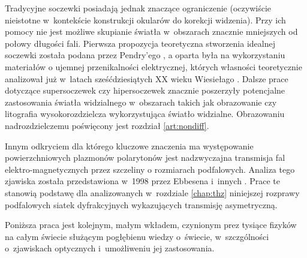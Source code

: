 Tradycyjne soczewki posiadają jednak znaczące ograniczenie (oczywiście nieistotne w~kontekście konstrukcji okularów do korekcji widzenia). Przy ich pomocy nie jest możliwe skupianie światła w~obszarach znacznie mniejszych od połowy długości fali. Pierwsza propozycja teoretyczna stworzenia idealnej soczewki została podana przez Pendry'ego \cite{PhysRevLett.85.3966}, a oparta była na wykorzystaniu materiałów o ujemnej przenikalności elektrycznej, których własności teoretycznie analizował już w~latach sześćdziesiątych XX wieku Wiesiełago \cite{veselago1968electrodynamics}. Dalsze prace dotyczące supersoczewek czy hipersoczewek \cite{liu2007far} znacznie poszerzyły potencjalne zastosowania światła widzialnego w~obszarach takich jak obrazowanie czy litografia wysokorozdzielcza wykorzystująca światło widzialne. Obrazowaniu nadrozdzielczemu poświęcony jest rozdział \ref{art:nondiff}.

Innym odkryciem dla którego kluczowe znaczenia ma występowanie powierzchniowych plazmonów polarytonów jest nadzwyczajna transmisja fal elektro-magnetycznych przez szczeliny o rozmiarach podfalowych. Analiza tego zjawiska została przedstawiona w~1998 przez Ebbesena i~innych \cite{ebbesen1998extraordinary}. Prace te stanowią podstawę dla analizowanych w~rozdziale \ref{chap:thz} niniejszej rozprawy podfalowych siatek dyfrakcyjnych wykazujących transmisję asymetryczną.

Poniższa praca jest kolejnym, małym wkładem, czynionym prez tysiące fizyków na całym świecie służącym pogłębienu wiedzy o~świecie, w~szczgólności o~zjawiskach optycznych i~umożliweniu jej zastosowania.

